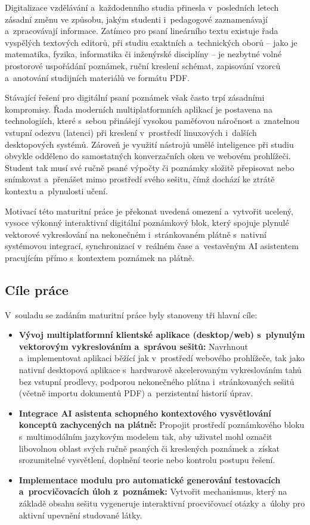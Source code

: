 \documentclass[12pt, a4paper, oneside]{article}
\begin{document}
Digitalizace vzdělávání a~každodenního studia přinesla v~posledních letech zásadní změnu ve způsobu, jakým studenti i~pedagogové zaznamenávají a~zpracovávají informace. Zatímco pro psaní lineárního textu existuje řada vyspělých textových editorů, při studiu exaktních a~technických oborů -- jako je matematika, fyzika, informatika či inženýrské disciplíny -- je nezbytné volné prostorové uspořádání poznámek, ruční kreslení schémat, zapisování vzorců a~anotování studijních materiálů ve formátu PDF.

Stávající řešení pro digitální psaní poznámek však často trpí zásadními kompromisy. Řada moderních multiplatformních aplikací je postavena na technologiích, které s~sebou přinášejí vysokou paměťovou náročnost a~znatelnou vstupní odezvu (latenci) při kreslení v~prostředí linuxových i~dalších desktopových systémů. Zároveň je využití nástrojů umělé inteligence při studiu obvykle odděleno do samostatných konverzačních oken ve webovém prohlížeči. Student tak musí své ručně psané výpočty či poznámky složitě přepisovat nebo snímkovat a~přenášet mimo prostředí svého sešitu, čímž dochází ke ztrátě kontextu a~plynulosti učení.

Motivací této maturitní práce je překonat uvedená omezení a~vytvořit ucelený, vysoce výkonný interaktivní digitální poznámkový blok, který spojuje plynulé vektorové vykreslování na nekonečném i~stránkovaném plátně s~nativní systémovou integrací, synchronizací v~reálném čase a~vestavěným AI asistentem pracujícím přímo s~kontextem poznámek na plátně.

\subsection{Cíle práce}
\label{sec:cile}

V~souladu se zadáním maturitní práce byly stanoveny tři hlavní cíle:
\begin{itemize}
    \item \textbf{Vývoj multiplatformní klientské aplikace (desktop/web) s~plynulým vektorovým vykreslováním a~správou sešitů:} Navrhnout a~implementovat aplikaci běžící jak v~prostředí webového prohlížeče, tak jako nativní desktopová aplikace s~hardwarově akcelerovaným vykreslováním tahů bez vstupní prodlevy, podporou nekonečného plátna i~stránkovaných sešitů (včetně importu dokumentů PDF) a~perzistentní historií úprav.
    \item \textbf{Integrace AI asistenta schopného kontextového vysvětlování konceptů zachycených na plátně:} Propojit prostředí poznámkového bloku s~multimodálním jazykovým modelem tak, aby uživatel mohl označit libovolnou oblast svých ručně psaných či kreslených poznámek a~získat srozumitelné vysvětlení, doplnění teorie nebo kontrolu postupu řešení.
    \item \textbf{Implementace modulu pro automatické generování testovacích a~procvičovacích úloh z~poznámek:} Vytvořit mechanismus, který na základě obsahu sešitu vygeneruje interaktivní procvičovací otázky a~úlohy pro aktivní upevnění studované látky.
\end{itemize}
\end{document}
